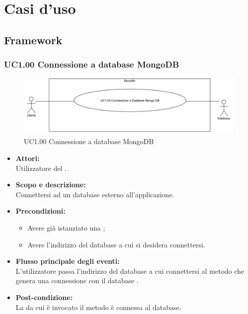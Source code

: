 \section{Casi d'uso}

\subsection{Framework}

\subsubsection{UC1.00 Connessione a database MongoDB} \label{UC1.00}

\begin{figure}[H]
	\centering
	\includegraphics[width=15cm]{../../documenti/AnalisiDeiRequisiti/Diagrammi_img/uc1_00.png}
	\caption{UC1.00 Connessione a database MongoDB}
\end{figure}

\begin{itemize}
\item \textbf{Attori:}
\\Utilizzatore del .
\item \textbf{Scopo e descrizione:} 
\\Connettersi ad un database  esterno all'applicazione.
\item \textbf{Precondizioni:}
	\begin{itemize}
		\item Avere già istanziato una ;
		\item Avere l'indirizzo del database  a cui si desidera connettersi.
	\end{itemize}
\item \textbf{Flusso principale degli eventi:}
\\L'utilizzatore passa l'indirizzo del database a cui connettersi al metodo che genera una connessione con il database .
\item \textbf{Post-condizione:}
\\La {} da cui è invocato il metodo è connessa al database.
\end{itemize}

